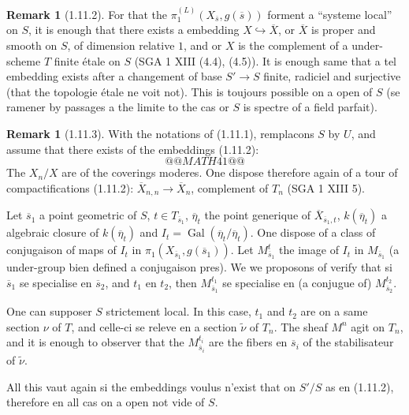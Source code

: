 \documentclass[12pt,a4paper]{article}
\theoremstyle{plain}
\theoremstyle{definition}
\newtheorem{remark}[theorem]{Remark}
\theoremstyle{remark}
\DeclareMathOperator{\Gal}{Gal}
\begin{document}
\begin{remark}[1.11.2]
For that the $\pi_1^{(L)}(X_{\overline{s}}, g(\overline{s}))$ forment a ``systeme local'' on $S$, it is enough that there exists a embedding $X \hookrightarrow \overline{X}$, or $\overline{X}$ is proper and smooth on $S$, of dimension relative $1$, and or $X$ is the complement of a under-scheme $T$ finite étale on $S$ (SGA 1 XIII (4.4), (4.5)). It is enough same that a tel embedding exists after a changement of base $S' \to S$ finite, radiciel and surjective (that the topologie étale ne voit not). This is toujours possible on a open of $S$ (se ramener by passages a the limite to the cas or $S$ is spectre of a field parfait).
\end{remark}

\begin{remark}[1.11.3]
With the notations of (1.11.1), remplacons $S$ by $U$, and assume that there exists of the embeddings (1.11.2):
\[
@@MATH41@@
\]
The $X_n/X$ are of the coverings moderes. One dispose therefore again of a tour of compactifications (1.11.2): $\overline{X}_{n,n} \to \overline{X}_n$, complement of $T_n$ (SGA 1 XIII 5).

Let $\overline{s}_1$ a point geometric of $S$, $t \in T_{\overline{s}_1}$, $\overline{\eta}_t$ the point generique of $\overline{X}_{\overline{s}_1,t}$, $k(\overline{\eta}_t)$ a algebraic closure of $k(\overline{\eta}_t)$ and $I_t = \Gal(\overline{\eta}_t/\overline{\eta}_t)$. One dispose of a class of conjugaison of maps of $I_t$ in $\pi_1(X_{\overline{s}_1}, g(\overline{s}_1))$. Let $M_{\overline{s}_1}^t$ the image of $I_t$ in $M_{\overline{s}_1}$ (a under-group bien defined a conjugaison pres). We we proposons of verify that si $\overline{s}_1$ se specialise en $\overline{s}_2$, and $t_1$ en $t_2$, then $M_{\overline{s}_1}^{t_1}$ se specialise en (a conjugue of) $M_{\overline{s}_2}^{t_2}$.

One can supposer $S$ strictement local. In this case, $t_1$ and $t_2$ are on a same section $\nu$ of $T$, and celle-ci se releve en a section $\widetilde{\nu}$ of $T_n$. The sheaf $M^n$ agit on $T_n$, and it is enough to observer that the $M_{\overline{s}_i}^{t_i}$ are the fibers en $\overline{s}_i$ of the stabilisateur of $\widetilde{\nu}$.

All this vaut again si the embeddings voulus n'exist that on $S'/S$ as en (1.11.2), therefore en all cas on a open not vide of $S$.


\end{remark}
\end{document}
